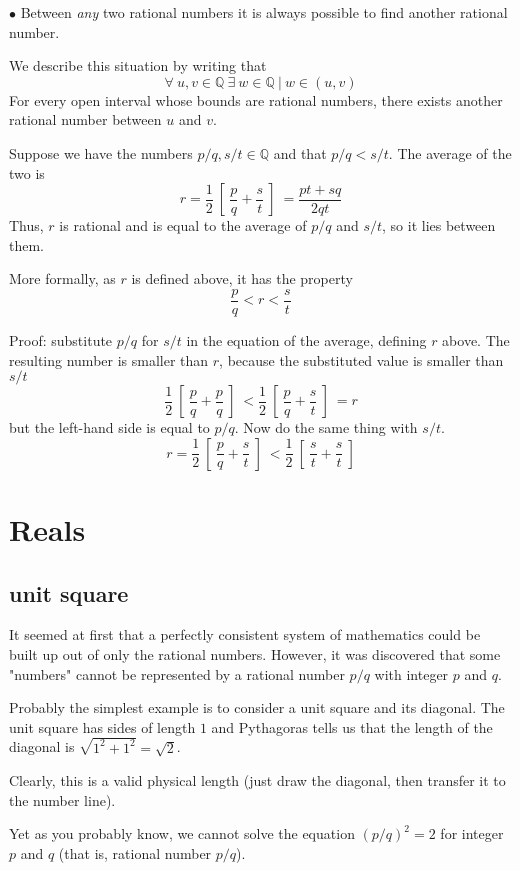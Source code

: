 \documentclass[11pt, oneside]{article}
\begin{document}
$\bullet$  Between \emph{any} two rational numbers it is always possible to find another rational number.  

We describe this situation by writing that
\[ \forall \ u,v \in \mathbb{Q} \ \exists \ w \in \mathbb{Q} \ | \ w \in (u,v) \]
For every open interval whose bounds are rational numbers, there exists another rational number between $u$ and $v$.

Suppose we have the numbers $p/q, s/t \in \mathbb{Q}$ and that $p/q < s/t$.  The average of the two is
\[ r = \frac{1}{2} \ [ \  \frac{p}{q} + \frac{s}{t} \ ] \ = \frac{pt+sq}{2qt} \]
Thus, $r$ is rational and is equal to the average of $p/q$ and $s/t$, so it lies between them.  

More formally, as $r$ is defined above, it has the property
\[ \frac{p}{q} < r < \frac{s}{t} \]

Proof:  substitute $p/q$ for $s/t$ in the equation of the average, defining $r$ above.  The resulting number is smaller than $r$, because the substituted value is smaller than $s/t$
\[ \frac{1}{2} \ [ \  \frac{p}{q} + \frac{p}{q} \ ] \ < \frac{1}{2} \ [ \  \frac{p}{q} + \frac{s}{t} \ ] \  = r \]
but the left-hand side is equal to $p/q$.  Now do the same thing with $s/t$.
\[ r = \frac{1}{2} \ [ \  \frac{p}{q} + \frac{s}{t} \ ] \ < \frac{1}{2} \ [ \  \frac{s}{t} + \frac{s}{t} \ ]  \]

\section*{Reals}

\subsection*{unit square}

It seemed at first that a perfectly consistent system of mathematics could be built up out of only the rational numbers.  However, it was discovered that some "numbers" cannot be represented by a rational number $p/q$ with integer $p$ and $q$.

Probably the simplest example is to consider a unit square and its diagonal.  The unit square has sides of length $1$ and Pythagoras tells us that the length of the diagonal is $\sqrt{1^2 + 1^2} = \sqrt{2}$.

Clearly, this is a valid physical length (just draw the diagonal, then transfer it to the number line).

Yet as you probably know, we cannot solve the equation $(p/q)^2 = 2$ for integer $p$ and $q$ (that is, rational number $p/q$).
\end{document}
